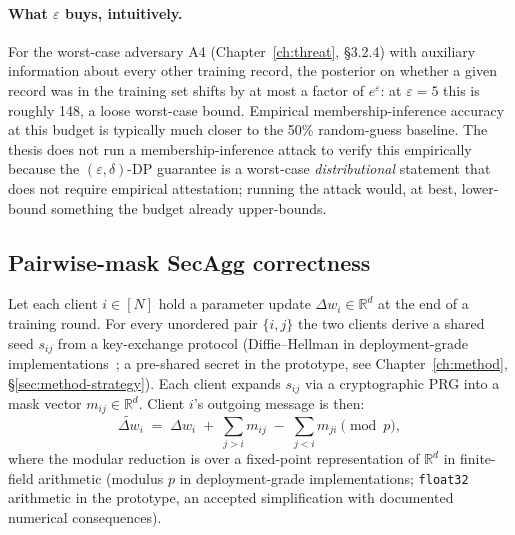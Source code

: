 \documentclass[11pt,a4paper]{report}
\begin{document}
\paragraph{What $\varepsilon$ buys, intuitively.}
For the worst-case adversary A4 (Chapter~\ref{ch:threat}, \S3.2.4) with
auxiliary information about every other training record, the posterior on
whether a given record was in the training set shifts by at most a factor
of $e^\varepsilon$: at $\varepsilon = 5$ this is roughly 148, a loose
worst-case bound. Empirical membership-inference accuracy at this budget
is typically much closer to the 50\% random-guess baseline. The thesis
does not run a membership-inference attack to verify this empirically
because the $(\varepsilon, \delta)$-DP guarantee is a worst-case
\emph{distributional} statement that does not require empirical
attestation; running the attack would, at best, lower-bound something the
budget already upper-bounds.

\subsection{Pairwise-mask SecAgg correctness}\label{sec:secagg-formal}

Let each client $i \in [N]$ hold a parameter update $\Delta w_i \in
\mathbb{R}^d$ at the end of a training round. For every unordered pair
$\{i, j\}$ the two clients derive a shared seed $s_{ij}$ from a
key-exchange protocol (Diffie--Hellman in deployment-grade
implementations~\cite{bonawitz2017secagg}; a pre-shared secret in the
prototype, see Chapter~\ref{ch:method}, \S\ref{sec:method-strategy}). Each
client expands $s_{ij}$ via a cryptographic PRG into a mask vector
$m_{ij} \in \mathbb{R}^d$. Client $i$'s outgoing message is then:
\begin{equation}\label{eq:masked-update}
  \tilde{\Delta w}_i \;=\; \Delta w_i \;+\; \sum_{j > i} m_{ij}
                                   \;-\; \sum_{j < i} m_{ji} \pmod{p},
\end{equation}
where the modular reduction is over a fixed-point representation of
$\mathbb{R}^d$ in finite-field arithmetic (modulus $p$ in deployment-grade
implementations; \texttt{float32} arithmetic in the prototype, an accepted
simplification with documented numerical consequences).
\end{document}
